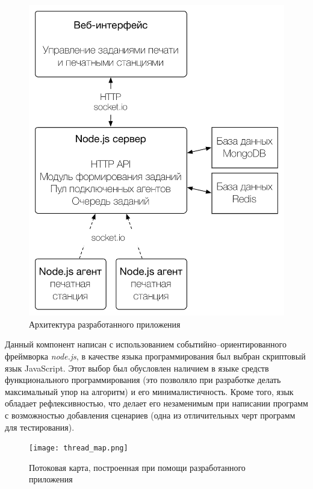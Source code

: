 \documentclass[a4paper,14pt,href]{article}
\begin{document}
\begin{figure}[htbp]
\begin{center}
	\includegraphics[scale=1.0]{architecture.pdf}
    \caption{Архитектура разработанного приложения}
    \label{fig:Architecture}
\end{center}
\end{figure}

Данный компонент написан с использованием со\-бы\-тий\-но--ориен\-тированного фреймворка \textit{node.js}\cite{nodejs}, в качестве языка программирования был выбран скриптовый язык JavaScript. Этот выбор был обусловлен наличием в языке средств функционального программирования (это позволяло при разработке делать максимальный упор на алгоритм) и его минималистичность. Кроме того, язык обладает рефлексивностью, что делает его незаменимым при написании программ с возможностью добавления сценариев (одна из отличительных черт программ для тестирования).

\begin{figure}[htbp]
\begin{center}
	\texttt{[image: thread\_map.png]}
    \caption{Потоковая карта, построенная при помощи разработанного приложения}
    \label{fig:ThreadMap}
\end{center}
\end{figure}
\end{document}
